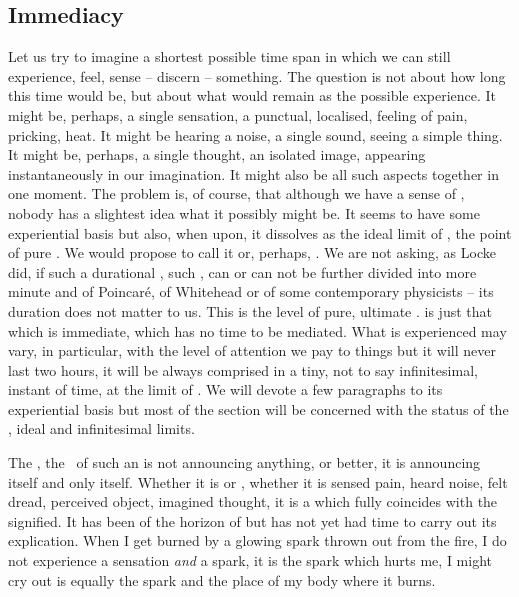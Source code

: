 \subsection{Immediacy}\label{sec:levelA}
\pa\label{pa:horizonImmediacy}
Let us try to imagine a shortest possible time span in which we can still 
experience, feel, sense -- discern -- something. The question is not about how long 
this time would be, but about what would remain as the possible experience. 
It might be, perhaps, a single sensation, a punctual, localised, feeling 
of pain, pricking, heat. It might be hearing a noise, a single 
sound, seeing a simple thing. It might be, perhaps, a single 
thought, an isolated image, appearing instantaneously in our imagination. It
might also be all such aspects together in one moment. The problem is, of
course, that although we have a sense of , nobody has a
slightest idea what it possibly might be. It seems to have some experiential
basis but also, when  upon, it dissolves as the ideal limit of
, the point of pure . 
We would propose to call it  or, perhaps, .  We are not asking, as Locke did,
if such a durational , such , can or
can not be further divided into more minute and   of Poincar\'{e},  of Whitehead or  of
some contemporary physicists -- its  duration does not matter to us. This is
the level of pure, ultimate .
 is just that which is immediate, which has no time
to be mediated. What is experienced  may vary, in particular,
with the level of attention we pay to things but it will never last two hours,
it will be always comprised in a tiny, not to say infinitesimal, instant of
time, at the limit of .
We will devote a few paragraphs to its
experiential basis but most of the section will be concerned with the status of
the , ideal and infinitesimal limits.

{}

\label{sub:originalSigns1}
The , the \os\ of such an  is not 
announcing anything, or better, it is announcing itself and only itself. 
Whether it is  or , 
whether it is sensed pain, heard noise, felt dread, perceived object, imagined 
thought, it is a  which fully coincides with the signified. 
It has been  of the horizon of  but 
 has not yet had time to carry out its  
explication. When I get burned by a glowing spark thrown out from the 
fire, I do not experience a sensation {\em and} a spark, it is the 
spark which hurts me, I might cry out 
 is equally the spark and the place of my body where it burns. 


